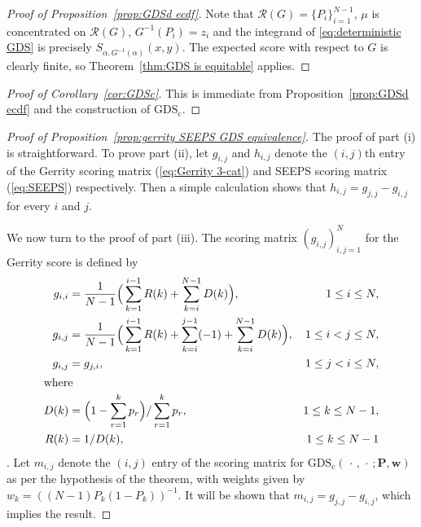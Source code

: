 \documentclass[10pt]{article} %
\theoremstyle{theorem}
\theoremstyle{definition}
\newcommand{\boldw}{\mathbf{w}}
\newcommand{\boldP}{\mathbf{P}}
\newcommand{\GDSc}{\mathrm{GDS}_\mathrm{c}}
\newcommand{\RG}{\mathcal{R}(G)}
\begin{document}
\begin{proof}[Proof of Proposition~\ref{prop:GDSd ecdf}]
Note that $\RG=\{P_i\}_{i=1}^{N-1}$, $\mu$ is concentrated on $\RG$, $G^{-1}(P_i)=z_i$ and the integrand of \eqref{eq:deterministic GDS} is precisely $S_{\alpha,G^{-1}(\alpha)}(x,y)$. The expected score with respect to $G$ is clearly finite, so Theorem~\ref{thm:GDS is equitable} applies.
\end{proof}

\begin{proof}[Proof of Corollary~\ref{cor:GDSc}]
This is immediate from Proposition~\ref{prop:GDSd ecdf} and the construction of $\GDSc$.
\end{proof}

\begin{proof}[Proof of Proposition~\ref{prop:gerrity SEEPS GDS equivalence}]
The proof of part (i) is straightforward. To prove part (ii), let $g_{i,j}$ and $h_{i,j}$ denote the $(i,j)$th entry of the Gerrity scoring matrix (\ref{eq:Gerrity 3-cat}) and SEEPS scoring matrix (\ref{eq:SEEPS}) respectively. Then a simple calculation shows that $h_{i,j}=g_{j,j}-g_{i,j}$ for every $i$ and $j$. 

We now turn to the proof of part (iii). The scoring matrix $(g_{i,j})_{i,j=1}^N$ for the Gerrity score is defined by
\begin{align*}
g_{i,i}&=\frac{1}{N-1}\Big(\sum_{k=1}^{i-1}R(k)+ \sum_{k=i}^{N-1}D(k)\Big), & 1\leq  i \leq N, \\
g_{i,j}&=\frac{1}{N-1}\Big(\sum_{k=1}^{i-1}R(k)+ \sum_{k=i}^{j-1}(-1) + \sum_{k=i}^{N-1}D(k)\Big), & 1\leq i < j \leq N, \\
g_{i,j}&=g_{j,i}, & 1\leq j < i \leq N, \\
\intertext{where}
D(k) &= \Big(1-\sum_{r=1}^k p_r \Big) / \sum_{r=1}^k p_r, & 1\leq  k \leq N-1, \\
R(k) &= 1/D(k), & 1\leq  k \leq N-1
\end{align*}
\citep{gerrity1992note}. Let $m_{i,j}$ denote the $(i,j)$ entry of the scoring matrix for $\GDSc(\,\cdot\,,\,\cdot\,; \boldP, \boldw)$ as per the hypothesis of the theorem, with weights given by $w_k=((N-1)P_k(1-P_k))^{-1}$. It will be shown that $m_{i,j}=g_{j,j}-g_{i,j}$, which implies the result.


\end{proof}
\end{document}
